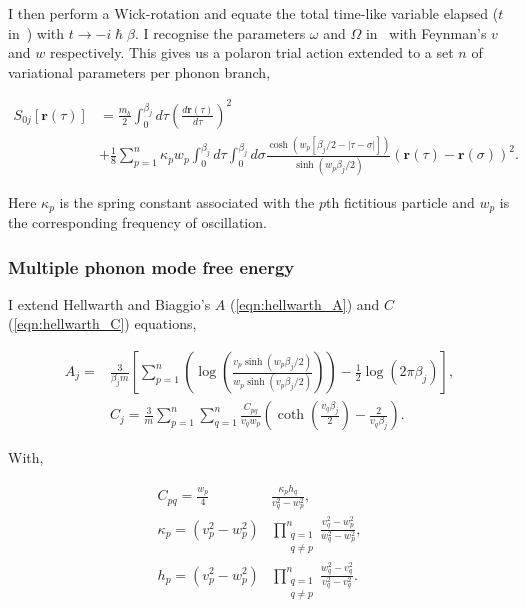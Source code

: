 I then perform a Wick-rotation and equate the total time-like variable elapsed ($t$ in~\cite{poulter_complete_1992}) with $t \rightarrow -i\hslash\beta$. I recognise the parameters $\omega$ and $\Omega$ in~\cite{poulter_complete_1992} with Feynman's $v$ and $w$ respectively. This gives us a polaron trial action extended to a set $n$ of variational parameters per phonon branch,

\begin{equation} \label{eqn:multi_trial_action}
    \begin{split}
        S_{0j}[\mathbf{r}(\tau)] &=
        \frac{m_b}{2}\int^{\beta_j}_0 d\tau \left(\frac{d\mathbf{r}(\tau)}{d\tau}\right)^2 \\
        &+ \frac{1}{8} \sum_{p = 1}^n \kappa_{p} w_{p} \int^{\beta_j}_0 d\tau \int^{\beta_j}_0 d\sigma \frac{\cosh{(w_{p}[\beta_j/2-|\tau-\sigma|])}}{\sinh{(w_{p}\beta_j/2)}}(\mathbf{r}(\tau) - \mathbf{r}(\sigma))^{2} .
    \end{split}
\end{equation}

Here $\kappa_{p}$ is the spring constant associated with the $p$th fictitious particle and $w_{p}$ is the corresponding frequency of oscillation. 

\subsubsection{Multiple phonon mode free energy}

I extend Hellwarth and Biaggio's $A$ (\ref{eqn:hellwarth_A}) and $C$ (\ref{eqn:hellwarth_C}) equations, 

\begin{subequations}
\begin{align}
    A_j = &\frac{3}{\beta_j m} \left[ \sum_{p = 1}^n \left( \log\left(\frac{v_{p} \sinh (w_{p} \beta_j / 2)}{w_{p} \sinh (v_{p} \beta_j / 2)}\right) \right) - \frac{1}{2} \log \left(2\pi\beta_j\right) \right] , \label{eqn:A} \\
    &C_j = \frac{3}{m} \sum_{p = 1}^n \sum_{q = 1}^n \frac{C_{pq}}{v_{q} w_{p}} \left( \coth \left( \frac{v_{q} \beta_j}{2} \right) - \frac{2}{v_{q} \beta_j} \right) . \label{eqn:C}
\end{align}
\end{subequations}

With, 

\begin{subequations}
    \begin{align}
        C_{pq} = \frac{w_{p}}{4} &\frac{\kappa_{p} h_{q}}{v_{q}^2 - w_{p}^2} ,\\
        \kappa_{p} = \left(v_{p}^2 - w_{p}^2 \right) &\prod\limits_{\substack{q=1 \\ q\neq p}}^n \frac{v_{q}^2 - w_{p}^2}{w_{q}^2 - w_{p}^2} ,\\
        h_{p} = \left( v_{p}^2 - w_{p}^2 \right) &\prod\limits_{\substack{q=1 \\ q\neq p}}^n \frac{w_{q}^2 - v_{q}^2}{v_{q}^2 - v_{q}^2} .
    \end{align}
\end{subequations}

